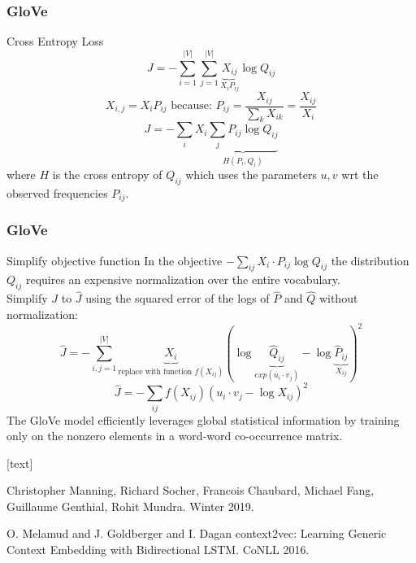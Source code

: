 \begin{frame}
\frametitle{GloVe}
\begin{alertblock}{Cross Entropy Loss}
\[ J = - \sum_{i=1}^{|V|} \sum_{j=1}^{|V|} \underbrace{X_{ij}}_{X_i P_{ij}} \log Q_{ij} \]
 \[ \textrm{$X_{i,j} = X_i P_{ij}$ because: } P_{ij} = \frac{X_{ij}}{\sum_{k} X_{ik}} = \frac{X_{ij}}{X_i} \]
\[ J = - \sum_i X_i \underbrace{\sum_j P_{ij} \log Q_{ij}}_{H(P_i, Q_i)} \]
where $H$ is the cross entropy of $Q_{ij}$ which uses the parameters $u, v$ wrt the observed frequencies $P_{ij}$.
\end{alertblock}
\end{frame}


\begin{frame}
\frametitle{GloVe}
\begin{alertblock}{Simplify objective function}
 In the objective $- \sum_{ij} X_i \cdot P_{ij} \log Q_{ij}$ the distribution $Q_{ij}$ requires an expensive normalization over the entire vocabulary.\\
Simplify $J$ to $\hat{J}$ using the squared error of the logs of $\hat{P}$ and $\hat{Q}$ without normalization:
\[ \hat{J} = - \sum_{i,j=1}^{|V|} \underbrace{X_i}_{\textrm{replace with function $f(X_{ij})$}} \left( \log \underbrace{\hat{Q}_{ij}}_{exp(u_i \cdot v_j)} - \log \underbrace{\hat{P}_{ij}}_{X_{ij}} \right)^2 \]
\[ \hat{J} = - \sum_{ij} f(X_{ij})  ( u_i \cdot v_j - \log X_{ij} )^2 \] 
The GloVe model efficiently leverages global statistical information by training only on the nonzero elements in a word-word co-occurrence matrix.
\end{alertblock}
\end{frame}

\begin{frame}
[text]
\begin{thebibliography}{10}

\alert{Christopher Manning, Richard Socher, Francois Chaubard, Michael Fang, Guillaume Genthial, Rohit Mundra.}
\newblock Winter 2019.


\alert{O. Melamud and J. Goldberger and I. Dagan}
\newblock context2vec: Learning Generic Context Embedding with Bidirectional LSTM.
\newblock CoNLL 2016.
\end{thebibliography}
\end{frame}





